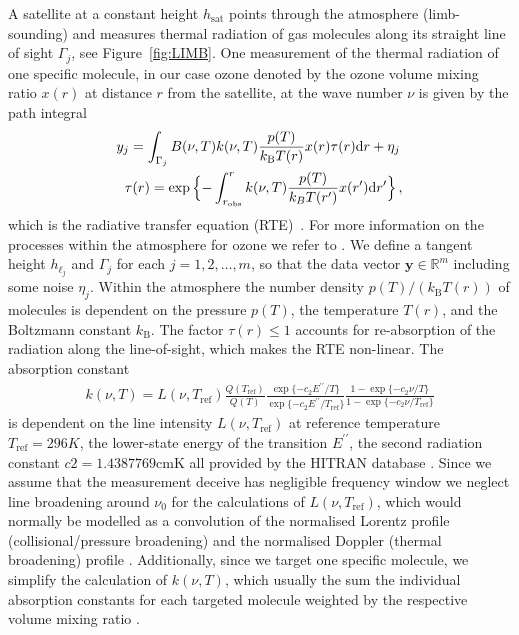A satellite at a constant height $h_{\text{sat}}$ points through the atmosphere (limb-sounding) and measures thermal radiation of gas molecules along its straight line of sight $\Gamma_j$, see  Figure~\ref{fig:LIMB}.
One measurement of the thermal radiation of one specific molecule, in our case ozone denoted by the ozone volume mixing ratio $x(r)$ at distance $r$ from the satellite, at the wave number $\nu$ is given by the path integral
\begin{align}
	\label{eq:RTE} 
	y_j =   \int_{\Gamma_j}  B(\nu,T) k(\nu, T)   \frac{p(T)}{k_{\text{B}} T(r)}  x(r)  \tau(r) \text{d}r + \eta_j \, \\
	\tau(r) = \exp{ \Bigl\{ - \int^{r}_{r_\text{obs}}  k(\nu, T)   \frac{p(T)}{k_B T(r^{\prime})}  x(r^{\prime}) \text{d}r^{\prime} \Bigr\} } \, ,\label{eq:absRTE} 
\end{align}
which is the radiative transfer equation (RTE)~\cite{mipas2000handbook}.
For more information on the processes within the atmosphere for ozone we refer to \cite{Lee2020NightOzone}.
We define a tangent height $h_{\ell_j}$ and $\Gamma_j$ for each $j=1,2,\ldots,m$, so that the data vector $\bm{y} \in \mathbb{R}^m$ including some noise $\eta_j$.
Within the atmosphere the number density $p(T) / (k_{\text{B}} T(r))$ of molecules is dependent on the pressure $p(T)$, the temperature $T(r)$, and the Boltzmann constant $k_{\text{B}}$.
The factor $\tau(r)\leq 1$ accounts for re-absorption of the radiation along the line-of-sight, which makes the RTE non-linear.
The absorption constant
\begin{align}
	k(\nu, T) = L(\nu, T_{\text{ref}}) \frac{Q(T_{\text{ref}})}{Q(T)} \frac{ \exp{\{ - c_2 E^{\prime \prime} / T\}} }{\exp{\{ - c_2 E^{\prime \prime} / T_{\text{ref}} \}}} \frac{ 1- \exp{\{ - c_2 \nu  / T \}} }{1 - \exp{\{ - c_2 \nu / T_{\text{ref}} \}}}
\end{align}
is dependent on the line intensity $L(\nu, T_{\text{ref}})$ at reference temperature $T_{\text{ref}} =296K $, the lower-state energy of the transition $ E^{\prime \prime} $, the second radiation constant $c2=1.4387769\text{cmK}$ all provided by the HITRAN database \cite{gordon2022hitran2020}.
Since we assume that the measurement deceive has negligible frequency window we neglect line broadening around $\nu_0$ for the calculations of $L(\nu, T_{\text{ref}})$, which would normally be modelled as a convolution of the normalised Lorentz profile (collisional/pressure broadening) and the normalised Doppler (thermal broadening) profile \cite{}.
Additionally, since we target one specific molecule, we simplify the calculation of $k(\nu, T)$, which usually the sum the individual absorption constants for each targeted molecule weighted by the respective volume mixing ratio \cite{}.
